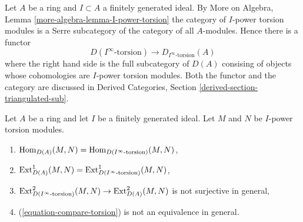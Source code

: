 \noindent
Let $A$ be a ring and $I \subset A$ a finitely generated ideal.
By More on Algebra, Lemma \ref{more-algebra-lemma-I-power-torsion}
the category of $I$-power torsion modules is a Serre subcategory
of the category of all $A$-modules. Hence there is a functor
\begin{equation}
\label{equation-compare-torsion}
D(I^\infty\text{-torsion}) \longrightarrow D_{I^\infty\text{-torsion}}(A)
\end{equation}
where the right hand side is the full subcategory of $D(A)$
consising of objects whose cohomologies are $I$-power torsion modules.
Both the functor and the category are discussed in
Derived Categories, Section \ref{derived-section-triangulated-sub}.

\begin{lemma}
\label{lemma-not-equal}
Let $A$ be a ring and let $I$ be a finitely generated ideal.
Let $M$ and $N$ be $I$-power torsion modules.
\begin{enumerate}
\item $\mathop{\mathrm{Hom}}\nolimits_{D(A)}(M, N) = \mathop{\mathrm{Hom}}\nolimits_{D({I^\infty\text{-torsion}})}(M, N)$,
\item $\mathop{\mathrm{Ext}}\nolimits^1_{D(A)}(M, N) =
\mathop{\mathrm{Ext}}\nolimits^1_{D({I^\infty\text{-torsion}})}(M, N)$,
\item $\mathop{\mathrm{Ext}}\nolimits^2_{D({I^\infty\text{-torsion}})}(M, N) \to
\mathop{\mathrm{Ext}}\nolimits^2_{D(A)}(M, N)$ is not surjective in general,
\item (\ref{equation-compare-torsion}) is not an equivalence in general.
\end{enumerate}
\end{lemma}

